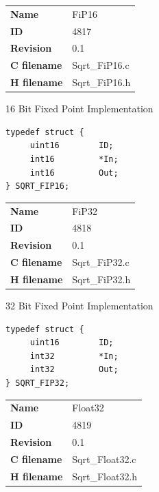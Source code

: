 \ifdefined \AddTestReports
{}
\fi
{}
\nopagebreak[0]
\begin{tabular}{l l}
\textbf{Name} & FiP16 \tabularnewline
\textbf{ID} & 4817 \tabularnewline
\textbf{Revision} & 0.1 \tabularnewline
\textbf{C filename} & Sqrt\_FiP16.c \tabularnewline
\textbf{H filename} & Sqrt\_FiP16.h \tabularnewline
\end{tabular}
\vspace{1ex}

16 Bit Fixed Point Implementation

\begin{lstlisting}
typedef struct {
     uint16        ID;
     int16         *In;
     int16         Out;
} SQRT_FIP16;
\end{lstlisting}

\ifdefined \AddTestReports
{}
\fi
{}
\nopagebreak[0]
\begin{tabular}{l l}
\textbf{Name} & FiP32 \tabularnewline
\textbf{ID} & 4818 \tabularnewline
\textbf{Revision} & 0.1 \tabularnewline
\textbf{C filename} & Sqrt\_FiP32.c \tabularnewline
\textbf{H filename} & Sqrt\_FiP32.h \tabularnewline
\end{tabular}
\vspace{1ex}

32 Bit Fixed Point Implementation

\begin{lstlisting}
typedef struct {
     uint16        ID;
     int32         *In;
     int32         Out;
} SQRT_FIP32;
\end{lstlisting}

\ifdefined \AddTestReports
{}
\fi
{}
\nopagebreak[0]
\begin{tabular}{l l}
\textbf{Name} & Float32 \tabularnewline
\textbf{ID} & 4819 \tabularnewline
\textbf{Revision} & 0.1 \tabularnewline
\textbf{C filename} & Sqrt\_Float32.c \tabularnewline
\textbf{H filename} & Sqrt\_Float32.h \tabularnewline
\end{tabular}
\vspace{1ex}


